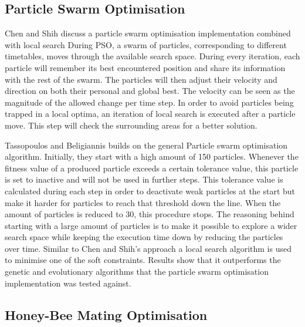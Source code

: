 \subsection{Particle Swarm Optimisation}

Chen and Shih \cite{Chen2013} discuss a particle swarm optimisation implementation combined with local search %
During PSO, a swarm of particles, corresponding to different timetables, moves through the available search space. During every iteration, each particle will remember its best encountered position and share its information with the rest of the swarm. The particles will then adjust their velocity and direction on both their personal and global best. The velocity can be seen as the magnitude of the allowed change per time step. In order to avoid particles being trapped in a local optima, an iteration of local search is executed after a particle move. This step will check the surrounding areas for a better solution. 

Tassopoulos and Beligiannis \cite{Tassopoulos2012} builds on the general Particle swarm optimisation algorithm. Initially, they start with a high amount of 150 particles. Whenever the fitness value of a produced particle exceeds a certain tolerance value, this particle is set to inactive and will not be used in further steps. This tolerance value is calculated during each step in order to deactivate weak particles at the start but make it harder for particles to reach that threshold down the line. When the amount of particles is reduced to 30, this procedure stops. The reasoning behind starting with a large amount of particles is to make it possible to explore a wider search space while keeping the execution time down by reducing the particles over time. Similar to Chen and Shih's approach \cite{Chen2013} a local search algorithm is used to minimise one of the soft constraints. Results show that it outperforms the genetic and evolutionary algorithms that the particle swarm optimisation implementation was tested against.
\subsection{Honey-Bee Mating Optimisation}


